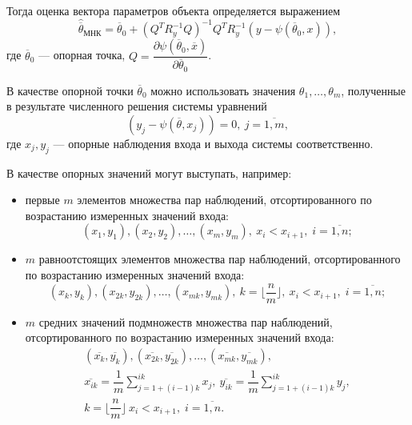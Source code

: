 Тогда оценка вектора параметров объекта определяется выражением
\begin{equation}
  \label{eq:nonlinear_lse}
  \hat{\overline{\theta}}_{\text{МНК}} =
  \overline{\theta}_0 + (Q^T R^{-1}_{y} Q)^{-1} Q^T R^{-1}_{y} (y - \psi(\overline{\theta}_0, x)),
\end{equation}
где \( \overline{\theta}_0 \) --- опорная точка,
\( Q = \dfrac{\partial \psi(\overline{\theta}_0, \overline{x}) }{ \partial \overline{\theta}_0 } \).

В качестве опорной точки \( \overline{\theta}_0 \) можно использовать значения
\( \theta_1, \dotsc, \theta_m \),
полученные в результате численного решения системы уравнений
\begin{equation}
  \label{eq:nonlinear_basic}
  (y_j - \psi( \overline{\theta}, x_j )) = 0, \: j = \overline{1,m},
\end{equation}
где \( x_j, y_j \) --- опорные наблюдения входа и выхода системы соответственно.

В качестве опорных значений могут выступать, например:
\begin{itemize}
\item первые \( m \) элементов множества пар наблюдений,
  отсортированного по возрастанию измеренных значений входа:
  \[
    (x_1, y_1), (x_2, y_2), \dotsc , (x_m, y_m), \:
    x_i < x_{i+1}, \;
    i = \overline{1, n};
  \]
\item \( m \) равноотстоящих элементов множества пар наблюдений,
  отсортированного по возрастанию измеренных значений входа:
  \[
    (x_{k}, y_{k}), (x_{2k}, y_{2k}) , \dotsc , (x_{mk}, y_{mk}), \:
    k = \lfloor \dfrac{n}{m} \rfloor, \:
    x_i < x_{i+1}, \;
    i = \overline{1, n};
  \]
\item \( m \) средних значений подмножеств множества пар наблюдений,
  отсортированного по возрастанию измеренных значений входа:
  \begin{equation}
    \begin{gathered}
      ( \overline{x_{k}}, \overline{y_{k}} ),
      ( \overline{x_{2k}}, \overline{y_{2k}} ),
      \dotsc ,
      ( \overline{x_{mk}}, \overline{y_{mk}}), \\
      \overline{x_{ik}} = \dfrac{1}{m} \sum_{j = 1+(i-1)k}^{ik} x_j, \:
      \overline{y_{ik}} = \dfrac{1}{m} \sum_{j = 1+(i-1)k}^{ik} y_j, \\
      k = \lfloor \dfrac{n}{m} \rfloor \:
      x_i < x_{i+1}, \; i = \overline{1, n}.
    \end{gathered}
    \label{eq:nonlinear_base_values}
  \end{equation}
\end{itemize}

